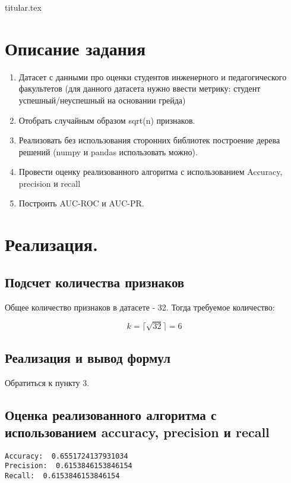 \documentclass[11pt, a4paper]{article}
\begin{document}
{titular.tex}
\newpage

\section{Описание задания}

\begin{enumerate}
    \item Датасет с данными про оценки студентов инженерного и педагогического факультетов (для данного датасета нужно ввести метрику: студент успешный/неуспешный на основании грейда)
    \item Отобрать случайным образом sqrt(n) признаков.
    \item Реализовать без использования сторонних библиотек построение дерева решений (numpy и pandas использовать можно).
    \item Провести оценку реализованного алгоритма с использованием Accuracy, precision и recall
    \item Построить AUC-ROC и AUC-PR.
\end{enumerate}

\section{Реализация.}

\subsection{Подсчет количества признаков}

Общее количество признаков в датасете - 32. Тогда требуемое количество: 

$$
  k = \lceil \sqrt{32} \rceil = 6
$$

\subsection{Реализация и вывод формул}

Обратиться к пункту 3.

\subsection{Оценка реализованного алгоритма с использованием accuracy, precision и recall}

\begin{Verbatim}
Accuracy:  0.6551724137931034
Precision:  0.6153846153846154
Recall:  0.6153846153846154
\end{Verbatim}
\end{document}
